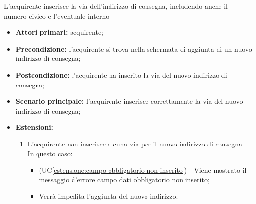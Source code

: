 L'acquirente inserisce la via dell'indirizzo di consegna, includendo anche il numero civico e l'eventuale interno.
\begin{itemize}
    \item \textbf{Attori primari:} acquirente;
    \item \textbf{Precondizione:} l'acquirente si trova nella schermata di aggiunta di un nuovo indirizzo di consegna;
    \item \textbf{Postcondizione:} l'acquirente ha inserito la via del nuovo indirizzo di consegna;
    \item \textbf{Scenario principale:} l'acquirente inserisce correttamente la via del nuovo indirizzo di consegna;
    \item \textbf{Estensioni:}
    \begin{enumerate}[label=\lett]
        \item L'acquirente non inserisce alcuna via per il nuovo indirizzo di consegna. In questo caso:
        \begin{itemize}
            \item (UC\ref{estensione:campo-obbligatorio-non-inserito}) - Viene mostrato il messaggio d'errore campo dati obbligatorio non inserito;
            \item Verrà impedita l'aggiunta del nuovo indirizzo.
        \end{itemize}
    \end{enumerate}
\end{itemize}

\label{inserimento-indirizzo-consegna.modulo.cap}

